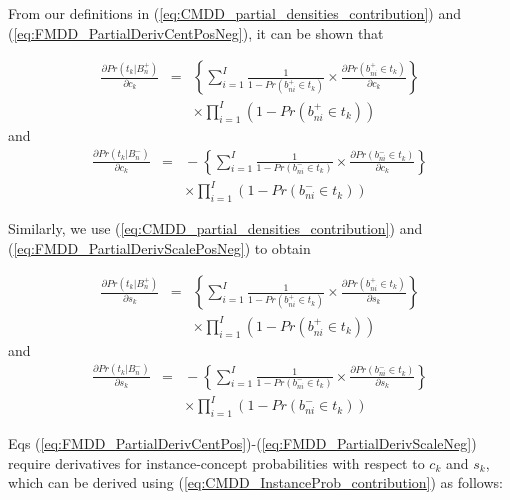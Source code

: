 \documentclass[12pt,dvips]{report}
\numberwithin{equation}{section}
\begin{document}
From our definitions in (\ref{eq:CMDD_partial_densities_contribution}) and (\ref{eq:FMDD_PartialDerivCentPosNeg}), it can be shown that

\begin{eqnarray} \label{eq:FMDD_PartialDerivCentPos}
\frac{\partial Pr(t_{k}\vert B_{n}^{+})}{\partial c_{k}}\!\!&=&\!\!\left\{ \sum_{i=1}^{I}\frac{1}{1-Pr(b_{ni}^{+}\in t_{k})}\times\frac{\partial Pr(b_{ni}^{+}\in t_{k})}{\partial c_{k}}\right\}  \nonumber \\
                                                   &  & \times \prod_{i=1}^{I}(1-Pr(b_{ni}^{+}\in t_{k}))  
\end{eqnarray}
and
\begin{eqnarray} \label{eq:FMDD_PartialDerivCentNeg}
\frac{\partial Pr(t_{k}\vert B_{n}^{-})}{\partial c_{k}}\!\!\!&\!=\!&\!\!\! -\left\{ \sum_{i=1}^{I}\frac{1}{1-Pr(b_{ni}^{-}\in t_{k})}\times\frac{\partial Pr(b_{ni}^{-}\in t_{k})}{\partial c_{k}}\right\}   \nonumber \\
 				                      &  & \times \prod_{i=1}^{I}(1-Pr(b_{ni}^{-}\in t_{k})) 
\end{eqnarray}

Similarly, we use (\ref{eq:CMDD_partial_densities_contribution}) and (\ref{eq:FMDD_PartialDerivScalePosNeg}) to obtain

\begin{eqnarray} \label{eq:FMDD_PartialDerivScalePos}
\frac{\partial Pr(t_{k}\vert B_{n}^{+})}{\partial s_{k}}\!\!&=&\!\!\left\{ \sum_{i=1}^{I}\frac{1}{1-Pr(b_{ni}^{+}\in t_{k})}\times\frac{\partial Pr(b_{ni}^{+}\in t_{k})}{\partial s_{k}}\right\}  \nonumber \\
                                                   &  & \times \prod_{i=1}^{I}(1-Pr(b_{ni}^{+}\in t_{k}))  
\end{eqnarray}
and
\begin{eqnarray} \label{eq:FMDD_PartialDerivScaleNeg}
\frac{\partial Pr(t_{k}\vert B_{n}^{-})}{\partial s_{k}}\!\!\!&\!=\!&\!\!\! -\left\{ \sum_{i=1}^{I}\frac{1}{1-Pr(b_{ni}^{-}\in t_{k})}\times\frac{\partial Pr(b_{ni}^{-}\in t_{k})}{\partial s_{k}}\right\}   \nonumber \\
 				                      &  & \times \prod_{i=1}^{I}(1-Pr(b_{ni}^{-}\in t_{k})) 
\end{eqnarray}

Eqs (\ref{eq:FMDD_PartialDerivCentPos})-(\ref{eq:FMDD_PartialDerivScaleNeg}) require derivatives for instance-concept probabilities with respect to $c_{k}$ and $s_{k}$, which can be derived using (\ref{eq:CMDD_InstanceProb_contribution}) as follows:
\end{document}
